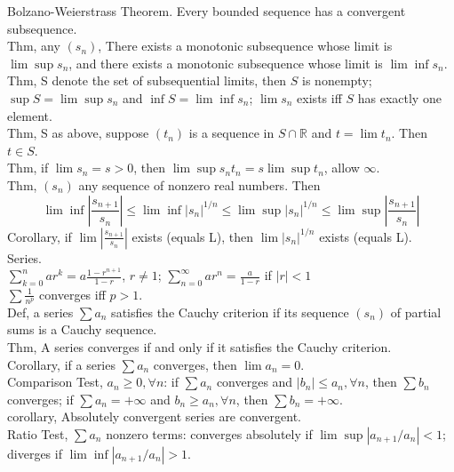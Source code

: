 \documentclass[paper=a4, fontsize=11pt]{scrartcl} %
\numberwithin{equation}{section} %
\numberwithin{figure}{section} %
\numberwithin{table}{section} %
\begin{document}
Bolzano-Weierstrass Theorem. Every bounded sequence has a convergent subsequence.\\
Thm, any $(s_n)$, There exists a monotonic subsequence whose limit is $\lim\sup s_n$, and there exists a monotonic subsequence whose limit is $\lim\inf s_n$.\\
Thm, S denote the set of subsequential limits, then $S$ is nonempty; $\sup S=\lim\sup s_n$ and $\inf S=\lim\inf s_n$; $\lim s_n$ exists iff $S$ has exactly one element.\\
Thm, S as above, suppose $(t_n)$ is a sequence in $S\cap \mathbb{R}$ and $t=\lim t_n$. Then $t\in S$.\\
Thm, if $\lim s_n=s>0$, then $\lim\sup s_nt_n = s\lim\sup t_n$, allow $\infty$.\\
Thm, $(s_n)$ any sequence of nonzero real numbers. Then
\begin{equation}
\lim\inf|\frac{s_{n+1}}{s_n}| \leq \lim\inf |s_n|^{1/n} \leq \lim\sup |s_n|^{1/n} \leq \lim\sup |\frac{s_{n+1}}{s_n}|
\end{equation}
Corollary, if $\lim |\frac{s_{n+1}}{s_n}|$ exists (equals L), then $\lim|s_n|^{1/n}$ exists (equals L).\\
Series.\\
$\sum_{k=0}^n ar^k = a\frac{1-r^{n+1}}{1-r}$, $r\neq 1$; $\sum_{n=0}^\infty ar^n = \frac{a}{1-r}$ if $|r|<1$\\
$\sum \frac{1}{n^p}$ converges iff $p>1$.\\
Def, a series $\sum a_n$ satisfies the Cauchy criterion if its sequence $(s_n)$ of partial sums is a Cauchy sequence.\\
Thm, A series converges if and only if it satisfies the Cauchy criterion.\\
Corollary, if a series $\sum a_n$ converges, then $\lim a_n = 0$.\\
Comparison Test, $a_n\geq 0, \forall n$: if $\sum a_n$ converges and $|b_n|\leq a_n,\forall n$, then $\sum b_n$ converges; if $\sum a_n = +\infty$ and $b_n\geq a_n, \forall n$, then $\sum b_n=+\infty$.\\
corollary, Absolutely convergent series are convergent.\\
Ratio Test, $\sum a_n$ nonzero terms: converges absolutely if $\lim\sup|a_{n+1}/a_n|<1$; diverges if $\lim\inf|a_{n+1}/a_n|>1$.\\
\end{document}
